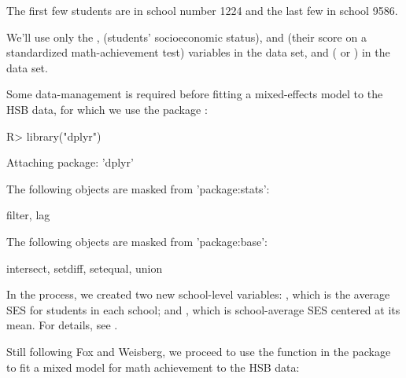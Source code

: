 \documentclass[
]{jss}
\begin{document}
The first few students are in school number 1224 and the last few in
school 9586.

We'll use only the ,  (students' socioeconomic
status), and  (their score on a standardized
math-achievement test) variables in the  data set, and
 ( or ) in the
 data set.

Some data-management is required before fitting a mixed-effects model to
the HSB data, for which we use the  package
\citep{WickhamEtAl:2023}:

\begin{CodeChunk}
\begin{CodeInput}
R> library("dplyr")
\end{CodeInput}
\begin{CodeOutput}

Attaching package: 'dplyr'
\end{CodeOutput}
\begin{CodeOutput}
The following objects are masked from 'package:stats':

    filter, lag
\end{CodeOutput}
\begin{CodeOutput}
The following objects are masked from 'package:base':

    intersect, setdiff, setequal, union
\end{CodeOutput}
\end{CodeChunk}

In the process, we created two new school-level variables:
, which is the average SES for students in each school;
and , which is school-average SES centered at its mean. For
details, see \citet[Sec. 7.2.2]{FoxWeisberg:2019}.

Still following Fox and Weisberg, we proceed to use the 
function in the  package \citep{BatesEtAl:2015} to fit a mixed
model for math achievement to the HSB data:
\end{document}
